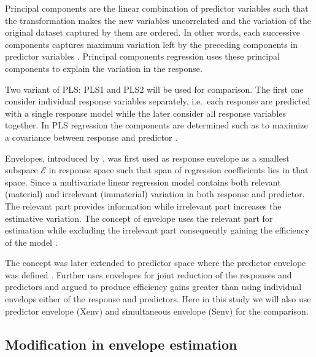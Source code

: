 \documentclass[12pt,3p,authoryear]{elsarticle}
\providecommand{\tightlist}{%
  \setlength{\itemsep}{0pt}\setlength{\parskip}{0pt}}
\begin{document}
\begin{description}
\tightlist
\item[\emph{Principal Components Regression (PCR):}]
Principal components are the linear combination of predictor variables
such that the transformation makes the new variables uncorrelated and
the variation of the original dataset captured by them are ordered. In
other words, each successive components captures maximum variation left
by the preceding components in predictor variables \citep{Jolliffe2002}.
Principal components regression uses these principal components to
explain the variation in the response.
\item[\emph{Partial Least Squares (PLS):}]
Two variant of PLS: PLS1 and PLS2 will be used for comparison. The first
one consider individual response variables separately, i.e.~each
response are predicted with a single response model while the later
consider all response variables together. In PLS regression the
components are determined such as to maximize a covariance between
response and predictor \citep{DeJong1993}.
\item[\emph{Envelopes:}]
Envelopes, introduced by \citet{Cook2007a}, was first used as response
envelope \citep{cook2010envelope} as a smallest subspace \(\mathcal{E}\)
in response space such that span of regression coefficients lies in that
space. Since a multivariate linear regression model contains both
relevant (material) and irrelevant (immaterial) variation in both
response and predictor. The relevant part provides information while
irrelevant part increases the estimative variation. The concept of
envelope uses the relevant part for estimation while excluding the
irrelevant part consequently gaining the efficiency of the model
\citep{cook2016algorithms}.

The concept was later extended to predictor space where the predictor
envelope was defined \citep{cook2013envelopes}. Further
\citet{cook2015simultaneous} uses envelopes for joint reduction of the
responses and predictors and argued to produce efficiency gains greater
than using individual envelops either of the response and predictors.
Here in this study we will also use predictor envelope (Xenv) and
simultaneous envelope (Senv) for the comparison.
\end{description}

\hypertarget{modification-in-envelope-estimation}{%
\subsection{Modification in envelope
estimation}\label{modification-in-envelope-estimation}}
\end{document}
